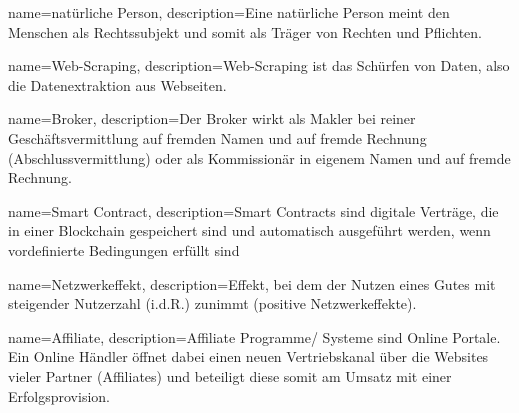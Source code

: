 {
name={natürliche Person},
description={\glqq Eine natürliche Person meint den Menschen als Rechtssubjekt und somit als Träger von Rechten und Pflichten.\grqq{} \cite{NatPerson_2018}}
}

{
name={Web-Scraping},
description={\glqq Web-Scraping ist das Schürfen von Daten, also die Datenextraktion aus Webseiten.\grqq{} \cite{webScraping_2021}}
}

{
name={Broker},
description={\glqq Der Broker wirkt als Makler bei reiner Geschäftsvermittlung auf fremden Namen und auf fremde Rechnung (Abschlussvermittlung) oder als Kommissionär in eigenem Namen und auf fremde Rechnung.\grqq{} \cite{broker_2018}}
}

{
name={Smart Contract},
description={\glqq Smart Contracts sind digitale Verträge, die in einer Blockchain gespeichert sind und automatisch ausgeführt werden, wenn vordefinierte Bedingungen erfüllt sind\grqq{} \cite{smartContract_2022}}
}

{
name={Netzwerkeffekt},
description={\glqq Effekt, bei dem der Nutzen eines Gutes mit steigender Nutzerzahl (i.d.R.) zunimmt (positive Netzwerkeffekte).\grqq{} \cite{Netzwerkeffekt_2018}}
}

{
name={Affiliate},
description={\glqq Affiliate Programme/ Systeme sind Online Portale. Ein Online Händler öffnet dabei einen neuen Vertriebskanal über die Websites vieler Partner (Affiliates) und beteiligt diese somit am Umsatz mit einer Erfolgsprovision.\grqq{} \cite{affiliate}}
}





